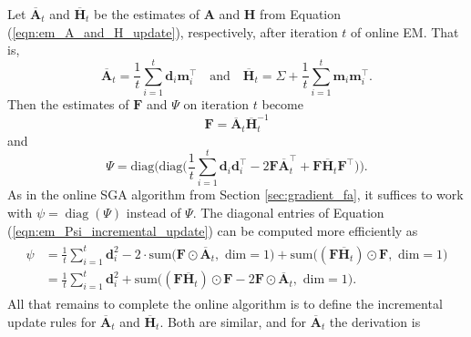 \documentclass[msc,deptreport.inf]{infthesis} %
\newcommand{\matr}[1]{\mathbf{#1}}
\newcommand{\diag}{\mathop{\mathrm{diag}}}
\begin{document}
Let $\overline{\matr{A}}_t$ and $\overline{\matr{H}}_t$ be the estimates of $\matr{A}$ and $\matr{H}$ from Equation (\ref{eqn:em_A_and_H_update}), respectively, after iteration $t$ of online EM. That is,
\begin{equation}\label{eqn:em_A_and_H_incremental_update}
	\overline{\matr{A}}_t = \frac{1}{t} \sum_{i=1}^t \matr{d}_i \matr{m}_i^\intercal \quad \text{and} \quad 
	\overline{\matr{H}}_t = \Sigma + \frac{1}{t} \sum_{i=1}^t \matr{m}_i \matr{m}_i^\intercal.
\end{equation}
Then the estimates of $\matr{F}$ and $\Psi$ on iteration $t$ become
\begin{equation}
	\matr{F} = \overline{\matr{A}}_t \overline{\matr{H}}_t^{-1}
\end{equation}
and
\begin{equation}\label{eqn:em_Psi_incremental_update}
	\Psi = \text{diag}\Bigg(\text{diag}\Bigg( \frac{1}{t} \sum_{i=1}^t \matr{d}_i \matr{d}_i^\intercal - 2 \matr{F}\overline{\matr{A}}_t^\intercal + \matr{F}\overline{\matr{H}}_t \matr{F}^\intercal \Bigg)\Bigg).
\end{equation}
As in the online SGA algorithm from Section \ref{sec:gradient_fa}, it suffices to work with $\psi = \diag(\Psi)$ instead of $\Psi$. 
The diagonal entries of Equation (\ref{eqn:em_Psi_incremental_update}) can be computed more efficiently as 
\begin{align}
\begin{split}\label{eqn:em_Psi_efficient_update}
	\psi 
	& = \frac{1}{t} \sum_{i=1}^t \matr{d}_i^2 
	- 2 \cdot \text{sum} \big(\matr{F} \odot \overline{\matr{A}}_t, \text{ dim} = 1\big)
	+ \text{sum}\big((\matr{F} \overline{\matr{H}}_t) \odot \matr{F}, \text{ dim} = 1\big) \\	
	& = \frac{1}{t} \sum_{i=1}^t \matr{d}_i^2 
	+ \text{sum} \big((\matr{F} \overline{\matr{H}}_t) \odot \matr{F} -2\matr{F} \odot \overline{\matr{A}}_t , \text{ dim} = 1\big).
\end{split}
\end{align}
All that remains to complete the online algorithm is to define the incremental update rules for $\overline{\matr{A}}_t$ and $\overline{\matr{H}}_t$. Both are similar, and for $\overline{\matr{A}}_t$ the derivation is 
\end{document}
